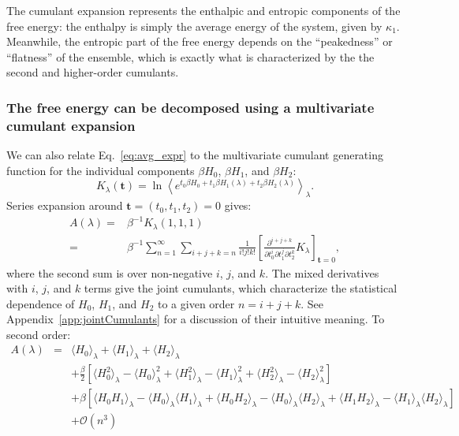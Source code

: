 \documentclass{article}
\let\vec\mathbf
\begin{document}
The cumulant expansion represents the enthalpic and entropic components of the free energy: the enthalpy is simply the average energy of the system, given by $\kappa_1$. Meanwhile, the entropic part of the free energy depends on the ``peakedness'' or ``flatness'' of the ensemble, which is exactly what is characterized by the the second and higher-order cumulants.

\subsubsection{The free energy can be decomposed using a multivariate cumulant expansion}

We can also relate Eq.~\ref{eq:avg_expr} to the multivariate cumulant generating function for the individual components $\beta H_0$, $\beta H_1$, and $\beta H_2$:
\begin{equation}
K_\lambda(\vec t) =
	\ln \left\langle 
    	e^{t_0 \beta H_0 + t_1 \beta H_1(\lambda) + t_2 \beta H_2(\lambda)}
    \right\rangle_\lambda.
    \label{eq:cGenMulti}
\end{equation}
Series expansion around $\vec t = (t_0, t_1, t_2) = 0$ gives:
\begin{align}
 A(\lambda) =& \beta^{-1} K_\lambda(1, 1,1) \nonumber\\
                  =& \beta^{-1} \sum_{n=1}^{\infty}
	        			\sum_{i+j+k=n}
            			\frac{1}{i!j!k!}\left[  \frac{\partial^{i+j+k}}{ \partial t_0^i \partial t_1^j \partial t_2^k}  K_\lambda\right]_{\vec t=0},
\label{eq:mult_expansion}
\end{align}
where  the second sum is over non-negative $i$, $j$, and $k$. The mixed derivatives with $i$, $j$, and $k$ terms give the joint cumulants, which characterize the statistical dependence of $H_0$, $H_1$, and $H_2$ to a given order $n=i+j+k$. See Appendix~\ref{app:jointCumulants} for a discussion of their intuitive meaning.
To second order: 
\begin{eqnarray}
A (\lambda) &=& 
\langle  H_0 \rangle_{\lambda}  + \langle  H_1 \rangle_{\lambda} + \langle  H_2 \rangle_{\lambda}  
\\ \nonumber  & & 
+ \frac{\beta}{2} \left[  \langle  H_0^2 \rangle_{\lambda} -\langle  H_0 \rangle^2_{\lambda}  +
\langle  H_1^2 \rangle_{\lambda} -\langle  H_1 \rangle^2_{\lambda}  
 + \langle  H_2^2 \rangle_{\lambda} -\langle  H_2 \rangle^2_{\lambda}   \right] 
\\ \nonumber  & & 
 + \beta \left[ \langle  H_0 H_1\rangle_{\lambda} -\langle  H_0 \rangle_{\lambda} \langle  H_1 \rangle_{\lambda} 
 +\langle  H_0 H_2\rangle_{\lambda} -\langle  H_0 \rangle_{\lambda} \langle  H_2 \rangle_{\lambda} 
 +\langle  H_1 H_2\rangle_{\lambda} -\langle  H_1 \rangle_{\lambda} \langle  H_2 \rangle_{\lambda} 
   \right]
  \\ & & 
 + \mathcal{O} (n^3) \nonumber
\label{eq:O2_expansion}
\end{eqnarray}
\end{document}

